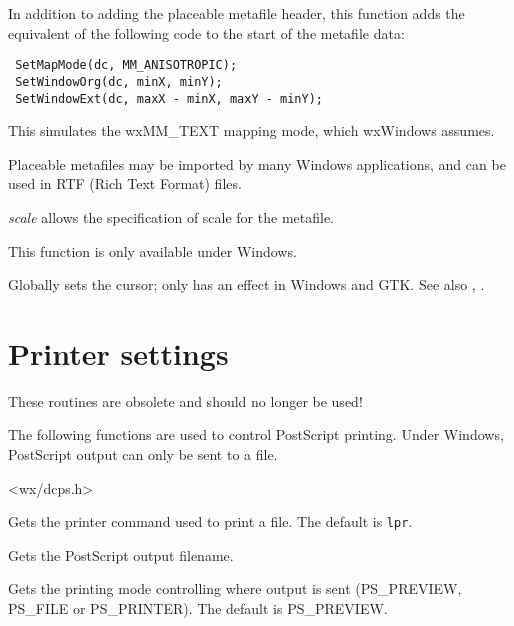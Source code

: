 In addition to adding the placeable metafile header, this function adds
the equivalent of the following code to the start of the metafile data:

\begin{verbatim}
 SetMapMode(dc, MM_ANISOTROPIC);
 SetWindowOrg(dc, minX, minY);
 SetWindowExt(dc, maxX - minX, maxY - minY);
\end{verbatim}

This simulates the wxMM\_TEXT mapping mode, which wxWindows assumes.

Placeable metafiles may be imported by many Windows applications, and can be
used in RTF (Rich Text Format) files.

{\it scale} allows the specification of scale for the metafile.

This function is only available under Windows.

\label{wxsetcursor}


Globally sets the cursor; only has an effect in Windows and GTK.
See also , .

\section{Printer settings}\label{printersettings}

These routines are obsolete and should no longer be used!

The following functions are used to control PostScript printing. Under
Windows, PostScript output can only be sent to a file.


<wx/dcps.h>



Gets the printer command used to print a file. The default is {\tt lpr}.



Gets the PostScript output filename.



Gets the printing mode controlling where output is sent (PS\_PREVIEW, PS\_FILE or PS\_PRINTER).
The default is PS\_PREVIEW.

